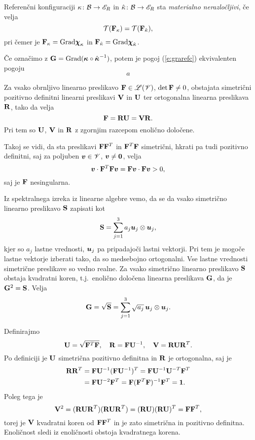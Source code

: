 \begin{definicija}
	Referenčni konfiguraciji $\kappa\colon\mathcal B\to\mathscr E_R$ in $\hat{\kappa}\colon\mathcal B\to\mathscr E_R$
	sta \emph{materialno nerazločljivi}, če velja
	\begin{equation} \label{e:grarefc}
		\mathcal{T}(\mathbf F_{\kappa})=\mathcal{T}(\mathbf F_{\hat{\kappa}}),
	\end{equation}
	pri čemer je $\mathbf F_{\kappa}=\mathrm{Grad}\boldsymbol \chi_{\kappa}$ in
	$\mathbf F_{\hat{\kappa}}=\mathrm{Grad}\boldsymbol \chi_{\hat{\kappa}}$.
\end{definicija}

Če označimo z $\mathbf G=\mathrm{Grad}(\boldsymbol \kappa\circ\hat{\boldsymbol \kappa}^{-1})$,
potem je pogoj (\ref{e:grarefc}) ekvivalenten pogoju
\[
	a
\]

\begin{izrek}
	Za vsako obrnljivo linearno preslikavo $\mathbf F\in\mathscr L(\mathscr V)$, $\det\mathbf F\neq 0$,
	obstajata simetrični pozitivno definitni linearni preslikavi $\mathbf V$ in $\mathbf U$
	ter ortogonalna linearna preslikava $\mathbf R$, tako da velja
	\[
		\mathbf F=\mathbf R\mathbf U=\mathbf V\mathbf R.
	\]
	Pri tem so $\mathbf U$, $\mathbf V$ in $\mathbf R$ z zgornjim razcepom enolično določene.
\end{izrek}

\proof
	Takoj se vidi, da sta preslikavi $\mathbf F\mathbf F^T$ in $\mathbf F^T\mathbf F$
	simetrični, hkrati pa tudi pozitivno definitni, saj za poljuben $\boldsymbol v\in\mathscr V$,
	$\boldsymbol v\neq\boldsymbol 0$, velja
	\[ \boldsymbol v\cdot\mathbf F^T\mathbf F\boldsymbol v=\mathbf F\boldsymbol v\cdot\mathbf F\boldsymbol v>0, \]
	saj je $\mathbf F$ nesingularna.
	
	Iz spektralnega izreka iz linearne algebre vemo, da se da vsako simetrično
	linearno preslikavo $\mathbf S$ zapisati kot
	\[ \mathbf S=\sum_{j=1}^3 a_j\boldsymbol u_j\otimes\boldsymbol u_j, \]
	kjer so $a_j$ lastne vrednosti, $\boldsymbol u_j$ pa pripadajoči lastni vektorji.
	Pri tem je mogoče lastne vektorje izberati tako, da so medsebojno ortogonalni.
	Vse lastne vrednosti simetrične preslikave so vedno realne. Za vsako
	simetrično linearno preslikavo $\mathbf S$ obstaja kvadratni koren, t.j.~enolično določena linearna
	preslikava $\mathbf G$, da je $\mathbf G^2=\mathbf S$. Velja
	\[ \mathbf G=\sqrt{\mathbf S}=\sum_{j=1}^3 \sqrt{a_j}\,\boldsymbol u_j\otimes\boldsymbol u_j. \]
	
	Definirajmo
	\[
		\mathbf U=\sqrt{\mathbf F^T\mathbf F},\quad\mathbf R=\mathbf F\mathbf U^{-1},\quad
		\mathbf V=\mathbf R\mathbf U\mathbf R^T.
	\]
	Po definiciji je $\mathbf U$ simetrična pozitivno definitna in $\mathbf R$ je ortogonalna, saj je
	\begin{align*}
		\mathbf R\mathbf R^T&=\mathbf F\mathbf U^{-1}(\mathbf F\mathbf U^{-1})^T
		=\mathbf F\mathbf U^{-1}\mathbf U^{-T}\mathbf F^T \\ &=\mathbf F\mathbf U^{-2}\mathbf F^T
		=\mathbf F(\mathbf F^T\mathbf F)^{-1}\mathbf F^T=\mathbf 1.
	\end{align*}
	Poleg tega je
	\[
		\mathbf V^2=(\mathbf R\mathbf U\mathbf R^T)(\mathbf R\mathbf U\mathbf R^T)
		=(\mathbf R\mathbf U)(\mathbf R\mathbf U)^T=\mathbf F\mathbf F^T,
	\]
	torej je $\mathbf V$ kvadratni koren od $\mathbf F\mathbf F^T$ in je zato
	simetrična in pozitivno definitna. Enoličnost sledi iz enoličnosti obstoja
	kvadratnega korena.
\endproof